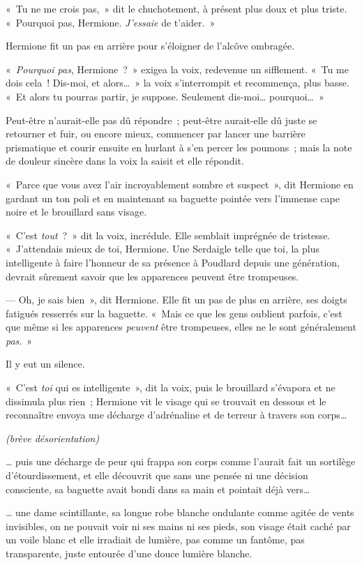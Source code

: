 «~Tu ne me crois pas,~» dit le chuchotement, à présent plus doux et plus triste. «~Pourquoi pas, Hermione. \emph{J'essaie} de t'aider.~»

Hermione fit un pas en arrière pour s'éloigner de l'alcôve ombragée.

«~\emph{Pourquoi pas}, Hermione~?~» exigea la voix, redevenue un sifflement. «~Tu me dois cela~! Dis-moi, et alors…~» la voix s'interrompit et recommença, plus basse. «~Et alors tu pourras partir, je suppose. Seulement dis-moi… pourquoi…~»

Peut-être n'aurait-elle pas dû répondre~; peut-être aurait-elle dû juste se retourner et fuir, ou encore mieux, commencer par lancer une barrière prismatique et courir ensuite en hurlant à s'en percer les poumons~; mais la note de douleur sincère dans la voix la saisit et elle répondit.

«~Parce que vous avez l'air incroyablement sombre et suspect~», dit Hermione en gardant un ton poli et en maintenant sa baguette pointée vers l'immense cape noire et le brouillard sans visage.

«~C'est \emph{tout}~?~» dit la voix, incrédule. Elle semblait imprégnée de tristesse. «~J'attendais mieux de toi, Hermione. Une Serdaigle telle que toi, la plus intelligente à faire l'honneur de sa présence à Poudlard depuis une génération, devrait sûrement savoir que les apparences peuvent être trompeuses.

--- Oh, je sais bien~», dit Hermione. Elle fit un pas de plus en arrière, ses doigts fatigués resserrés sur la baguette. «~Mais ce que les gens oublient parfois, c'est que même si les apparences \emph{peuvent} être trompeuses, elles ne le sont généralement \emph{pas}.~»

Il y eut un silence.

«~C'est \emph{toi} qui es intelligente~», dit la voix, puis le brouillard s'évapora et ne dissimula plus rien~; Hermione vit le visage qui se trouvait en dessous et le reconnaître envoya une décharge d'adrénaline et de terreur à travers son corps…

\emph{(brève désorientation)}

… puis une décharge de peur qui frappa son corps comme l'aurait fait un sortilège d'étourdissement, et elle découvrit que sans une pensée ni une décision consciente, sa baguette avait bondi dans sa main et pointait déjà vers…

… une dame scintillante, sa longue robe blanche ondulante comme agitée de vents invisibles, on ne pouvait voir ni ses mains ni ses pieds, son visage était caché par un voile blanc et elle irradiait de lumière, pas comme un fantôme, pas transparente, juste entourée d'une douce lumière blanche.

